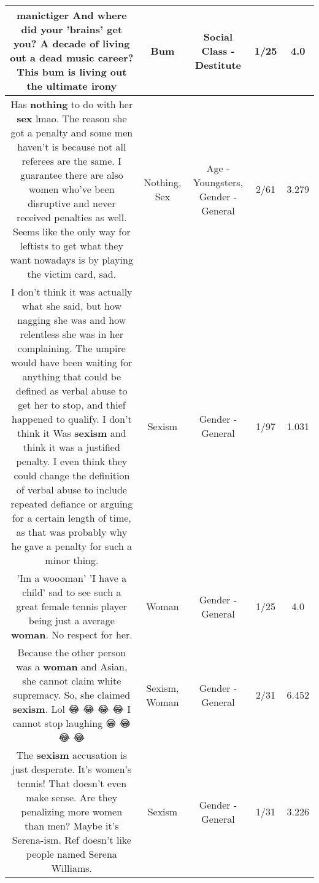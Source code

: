 \documentclass[11pt]{article}
\newlength\mylength
\begin{document}
\begin{center}
\begin{longtable}{|C{.65\mylength}|C{.30\mylength}|C{.12\mylength}|C{.12\mylength}|C{.12\mylength}|}
  \small manictiger And where did your 'brains' get you? A decade of living out a dead music career? This \textbf{bum} is living out the ultimate irony\normalsize   & Bum & Social Class - Destitute & 1/25 & 4.0 \\  \hline
  \small Has \textbf{nothing} to do with her \textbf{sex} lmao. The reason she got a penalty and some men haven't is because not all referees are the same. I guarantee there are also women who've been disruptive and never received penalties as well. Seems like the only way for leftists to get what they want nowadays is by playing the victim card, sad.\normalsize   & Nothing, Sex & Age - Youngsters, Gender - General & 2/61 & 3.279 \\  \hline
  \small I don't think it was actually what she said, but how nagging she was and how relentless she was in her complaining. The umpire would have been waiting for anything that could be defined as verbal abuse to get her to stop, and thief happened to qualify. I don't think it Was \textbf{sexism} and think it was a justified penalty. I even think they could change the definition of verbal abuse to include repeated defiance or arguing for a certain length of time, as that was probably why he gave a penalty for such a minor thing.\normalsize   & Sexism & Gender - General & 1/97 & 1.031 \\  \hline
  \small 'Im a woooman' 'I have a child' sad to see such a great female tennis player being just a average \textbf{woman}. No respect for her.\normalsize   & Woman & Gender - General & 1/25 & 4.0 \\  \hline
  \small Because the other person was a \textbf{woman} and  Asian, she cannot claim white supremacy. So, she claimed \textbf{sexism}. Lol 😂 😂 😂 😂  I cannot stop laughing 😁 😂 😂 😂\normalsize   & Sexism, Woman & Gender - General & 2/31 & 6.452 \\  \hline
  \small The \textbf{sexism} accusation is just desperate.  It's women's tennis!  That doesn't even make sense.  Are they penalizing more women than men?  Maybe it's Serena-ism.  Ref doesn't like people named Serena Williams.\normalsize   & Sexism & Gender - General & 1/31 & 3.226 \\  \hline

\end{longtable}
\end{center}
\end{document}
